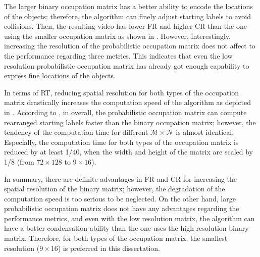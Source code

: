 \documentclass[11pt]{hyu_thesis}
\begin{document}
The larger binary occupation matrix has a better ability to encode the locations of the objects; therefore, the algorithm can finely adjust starting labels to avoid collisions. Then, the resulting video has lower FR and higher CR than the one using the smaller occupation matrix as shown in . However, interestingly, increasing the resolution of the probabilistic occupation matrix does not affect to the performance regarding three metrics. This indicates that even the low resolution probabilistic occupation matrix has already got enough capability to express fine locations of the objects.

In terms of RT, reducing spatial resolution for both types of the occupation matrix drastically increases the computation speed of the algorithm as depicted in . According to , in overall, the probabilistic occupation matrix can compute rearranged starting labels faster than the binary occupation matrix; however, the tendency of the computation time for different $\mathcal{M}\times\mathcal{N}$ is almost identical. Especially, the computation time for both types of the occupation matrix is reduced by at least 1/40, when the width and height of the matrix are scaled by 1/8 (from $72\times128$ to $9\times16$).

In summary, there are definite advantages in FR and CR for increasing the spatial resolution of the binary matrix; however, the degradation of the computation speed is too serious to be neglected. On the other hand, large probabilistic occupation matrix does not have any advantages regarding the performance metrics, and even with the low resolution matrix, the algorithm can have a better condensation ability than the one uses the high resolution binary matrix. Therefore, for both types of the occupation matrix, the smallest resolution ($9\times16$) is preferred in this dissertation.

\tableOccSzOne
{}\tableOccSzTwo
{}\tableOccSzThree
{}\tableOccSzFour
{}\tableOccSzFive

\tableProbOccSzOne
{}\tableProbOccSzTwo
{}\tableProbOccSzThree
{}\tableProbOccSzFour
{}\tableProbOccSzFive
\end{document}
